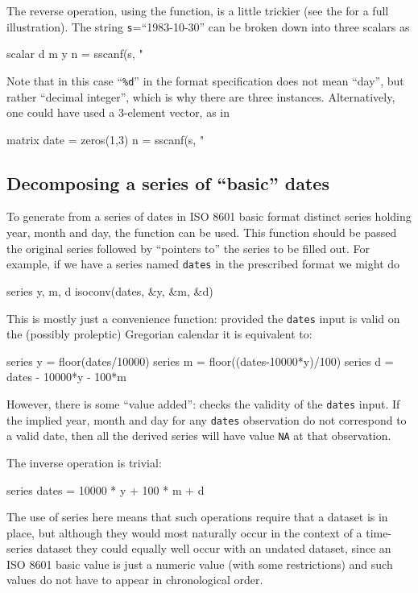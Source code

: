 The reverse operation, using the  function, is a little
trickier (see the \GCR{} for a full illustration). The string
\texttt{s}=``1983-10-30'' can be broken down into three scalars as
\begin{code}
  scalar d m y
  n = sscanf(s, "%
\end{code}
Note that in this case ``\texttt{\%d}'' in the format specification
does not mean ``day'', but rather ``decimal integer'', which is why
there are three instances. Alternatively, one could have used a
3-element vector, as in
\begin{code}
  matrix date = zeros(1,3)
  n = sscanf(s, "%
\end{code}

\subsection{Decomposing a series of ``basic'' dates}

To generate from a series of dates in ISO 8601 basic format distinct
series holding year, month and day, the function  can be
used. This function should be passed the original series followed by
``pointers to'' the series to be filled out. For example, if we have a
series named \texttt{dates} in the prescribed format we might do
%
\begin{code}
series y, m, d
isoconv(dates, &y, &m, &d)
\end{code}

This is mostly just a convenience function: provided the
\texttt{dates} input is valid on the (possibly proleptic) Gregorian
calendar it is equivalent to:
%
\begin{code}
series y = floor(dates/10000)
series m = floor((dates-10000*y)/100)
series d = dates - 10000*y - 100*m
\end{code}

However, there is some ``value added'':  checks the
validity of the \texttt{dates} input. If the implied year, month and
day for any \texttt{dates} observation do not correspond to a valid
date, then all the derived series will have value \texttt{NA} at that
observation.

The inverse operation is trivial:
\begin{code}
series dates = 10000 * y + 100 * m + d
\end{code}

The use of series here means that such operations require that a
dataset is in place, but although they would most naturally occur in
the context of a time-series dataset they could equally well occur
with an undated dataset, since an ISO 8601 basic value is just a
numeric value (with some restrictions) and such values do not have to
appear in chronological order.

